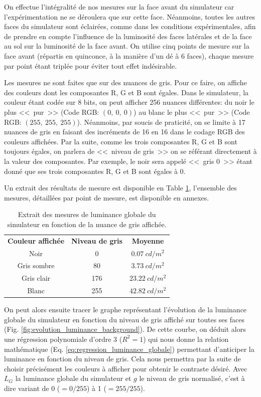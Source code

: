 	\par On effectue l'intégralité de nos mesures sur la face avant du simulateur car l'expérimentation ne se déroulera que sur cette face. Néanmoins, toutes les autres faces du simulateur sont éclairées, comme dans les conditions expérimentales, afin de prendre en compte l'influence de la luminosité des faces latérales et de la face au sol sur la luminosité de la face avant. On utilise cinq points de mesure sur la face avant (répartis en quinconce, à la manière d'un dé à 6 faces), chaque mesure par point étant triplée pour éviter tout effet indésirable.
	
	\par Les mesures ne sont faites que sur des nuances de gris. Pour ce faire, on affiche des couleurs dont les composantes R, G et B sont égales. Dans le simulateur, la couleur étant codée sur 8 bits, on peut afficher 256 nuances différentes: du noir le plus <<~pur~>> (Code RGB: $(0,~0,~0)$) au blanc le plus <<~pur~>> (Code RGB: $(255,~255,~255)$). Néanmoins, par soucis de praticité, on se limite à 17 nuances de gris en faisant des incréments de 16 en 16 dans le codage RGB des couleurs affichées. Par la suite, comme les trois composantes R, G et B sont toujours égales, on parlera de <<~niveau de gris~>> on se référant directement à la valeur des composantes. Par exemple, le noir sera appelé <<~gris 0~>> étant donné que ses trois composantes R, G et B sont égales à 0.
	
	\par Un extrait des résultats de mesure est disponible en Table \ref{tab:extrait_mesure_luminance_fond}, l'ensemble des mesures, détaillées par point de mesure, est disponible en annexes.
	
	\begin{table}[h]	
		\centering
		\caption{Extrait des mesures de luminance globale du simulateur en fonction de la nuance de gris affichée.}
		\label{tab:extrait_mesure_luminance_fond}
		\small
		\begin{tabular}{ccc}
			\textbf{Couleur affichée} & \textbf{Niveau de gris} & \textbf{Moyenne}\\
			Noir & 0 & $0.07~cd/m^2$\\
			Gris sombre & 80 & $3.73~cd/m^2$\\
			Gris clair & 176 & $23.22~cd/m^2$\\
			Blanc & 255 & $42.82~cd/m^2$
		\end{tabular}
	\end{table}
	
	\par On peut alors ensuite tracer le graphe représentant l'évolution de la luminance globale du simulateur en fonction du niveau de gris affiché sur toutes ses faces (Fig. \ref{fig:evolution_luminance_background}). De cette courbe, on déduit alors une régression polynomiale d'ordre 3 ($R^2 = 1$) qui nous donne la relation mathématique (Eq. \ref{eq:regression_luminance_globale}) permettant d'anticiper la luminance en fonction du niveau de gris. Cela nous permettra par la suite de choisir précisément les couleurs à afficher pour obtenir le contraste désiré. Avec $L_G$ la luminance globale du simulateur et $g$ le niveau de gris normalisé, c'est à dire variant de 0 ($= 0/255$) à 1 ($= 255/255$).
	
